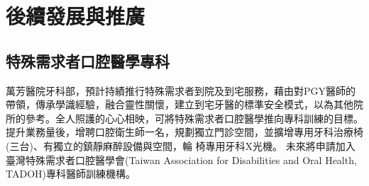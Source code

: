 \section{後續發展與推廣}
\subsection*{特殊需求者口腔醫學專科}

萬芳醫院牙科部，預計持績推行特殊需求者到院及到宅服務，藉由對PGY醫師的帶領，傳承學識經驗，融合靈性關懷，建立到宅牙醫的標準安全模式，以為其他院所的參考。全人照護的心心相映，可將特殊需求者口腔醫學推向專科訓練的目標。
提升業務量後，增聘口腔衛生師一名，規劃獨立門診空間，並擴增專用牙科治療椅(三台)、有獨立的鎮靜麻醉設備與空間，輪 椅專用牙科X光機。
未來將申請加入臺灣特殊需求者口腔醫學會(Taiwan Association for Disabilities and Oral Health, TADOH)專科醫師訓練機構。








